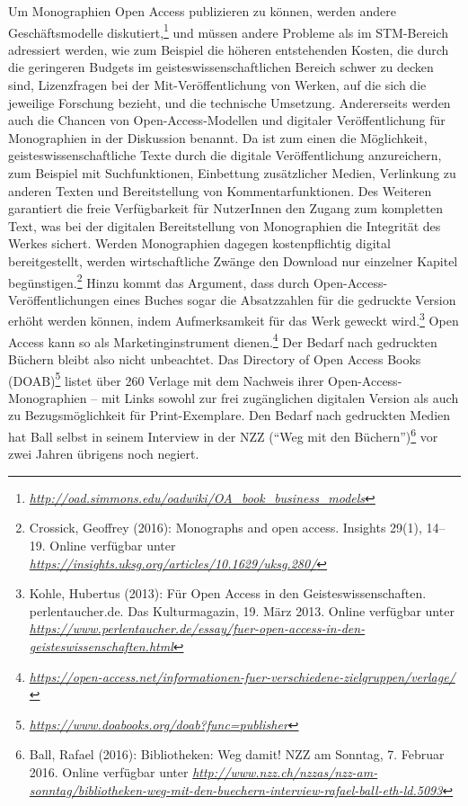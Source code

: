 \documentclass[a4paper,
fontsize=11pt,
oneside,
numbers=noperiodatend,
parskip=half-,
bibliography=totoc,
final
]{scrartcl}
\begin{document}
Um Monographien Open Access publizieren zu können, werden andere
Geschäftsmodelle diskutiert,\footnote{\href{http://oad.simmons.edu/oadwiki/OA_book_business_models}{\emph{http://oad.simmons.edu/oadwiki/OA\_book\_business\_models}}}
und müssen andere Probleme als im STM-Bereich adressiert werden, wie zum
Beispiel die höheren entstehenden Kosten, die durch die geringeren
Budgets im geisteswissenschaftlichen Bereich schwer zu decken sind,
Lizenzfragen bei der Mit-Veröffentlichung von Werken, auf die sich die
jeweilige Forschung bezieht, und die technische Umsetzung. Andererseits
werden auch die Chancen von Open-Access-Modellen und digitaler
Veröffentlichung für Monographien in der Diskussion benannt. Da ist zum
einen die Möglichkeit, geisteswissenschaftliche Texte durch die digitale
Veröffentlichung anzureichern, zum Beispiel mit Suchfunktionen,
Einbettung zusätzlicher Medien, Verlinkung zu anderen Texten und
Bereitstellung von Kommentarfunktionen. Des Weiteren garantiert die
freie Verfügbarkeit für NutzerInnen den Zugang zum kompletten Text, was
bei der digitalen Bereitstellung von Monographien die Integrität des
Werkes sichert. Werden Monographien dagegen kostenpflichtig digital
bereitgestellt, werden wirtschaftliche Zwänge den Download nur einzelner
Kapitel begünstigen.\footnote{Crossick, Geoffrey (2016): Monographs and
  open access. Insights 29(1), 14--19. Online verfügbar unter
  \href{https://insights.uksg.org/articles/10.1629/uksg.280/}{\emph{https://insights.uksg.org/articles/10.1629/uksg.280/}}}
Hinzu kommt das Argument, dass durch Open-Access-Veröffentlichungen
eines Buches sogar die Absatzzahlen für die gedruckte Version erhöht
werden können, indem Aufmerksamkeit für das Werk geweckt wird.\footnote{Kohle,
  Hubertus (2013): Für Open Access in den Geisteswissenschaften.
  perlentaucher.de. Das Kulturmagazin, 19. März 2013. Online verfügbar
  unter
  \href{https://www.perlentaucher.de/essay/fuer-open-access-in-den-geisteswissenschaften.html}{\emph{https://www.perlentaucher.de/essay/fuer-open-access-in-den-geisteswissenschaften.html}}}
Open Access kann so als Marketinginstrument dienen.\footnote{\href{https://open-access.net/informationen-fuer-verschiedene-zielgruppen/verlage/}{\emph{https://open-access.net/informationen-fuer-verschiedene-zielgruppen/verlage/}}}
Der Bedarf nach gedruckten Büchern bleibt also nicht unbeachtet. Das
Directory of Open Access Books (DOAB)\footnote{\href{https://www.doabooks.org/doab?func=publisher}{\emph{https://www.doabooks.org/doab?func=publisher}}}
listet über 260 Verlage mit dem Nachweis ihrer Open-Access-Monographien
-- mit Links sowohl zur frei zugänglichen digitalen Version als auch zu
Bezugsmöglichkeit für Print-Exemplare. Den Bedarf nach gedruckten Medien
hat Ball selbst in seinem Interview in der NZZ (\enquote{Weg mit den
Büchern})\footnote{Ball, Rafael (2016): Bibliotheken: Weg damit! NZZ am
  Sonntag, 7. Februar 2016. Online verfügbar unter
  \href{http://www.nzz.ch/nzzas/nzz-am-sonntag/bibliotheken-weg-mit-den-buechern-interview-rafael-ball-eth-ld.5093}{\emph{http://www.nzz.ch/nzzas/nzz-am-sonntag/bibliotheken-weg-mit-den-buechern-interview-rafael-ball-eth-ld.5093}}}
vor zwei Jahren übrigens noch negiert.
\end{document}
